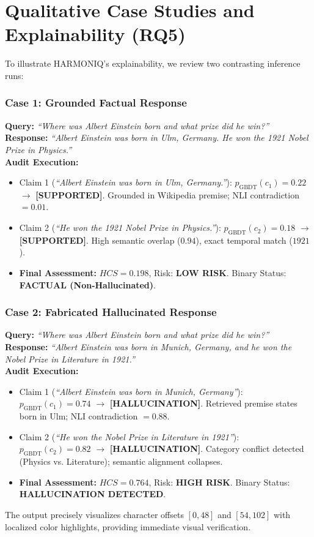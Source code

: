 \documentclass[conference]{IEEEtran}
\begin{document}
\section{Qualitative Case Studies and Explainability (RQ5)}
To illustrate HARMONIQ's explainability, we review two contrasting inference runs:

\subsubsection{Case 1: Grounded Factual Response}
\textbf{Query:} \textit{``Where was Albert Einstein born and what prize did he win?''}\\
\textbf{Response:} \textit{``Albert Einstein was born in Ulm, Germany. He won the 1921 Nobel Prize in Physics.''}\\
\textbf{Audit Execution:}
\begin{itemize}
    \item Claim 1 (\textit{``Albert Einstein was born in Ulm, Germany.''}): $p_{\text{GBDT}}(c_1) = 0.22$ $\to$ \textbf{\textcolor{green!60!black}{[SUPPORTED]}}. Grounded in Wikipedia premise; NLI contradiction $= 0.01$.
    \item Claim 2 (\textit{``He won the 1921 Nobel Prize in Physics.''}): $p_{\text{GBDT}}(c_2) = 0.18$ $\to$ \textbf{\textcolor{green!60!black}{[SUPPORTED]}}. High semantic overlap ($0.94$), exact temporal match ($1921$).
    \item \textbf{Final Assessment:} $HCS = 0.198$, Risk: \textbf{LOW RISK}. Binary Status: \textbf{FACTUAL (Non-Hallucinated)}.
\end{itemize}

\subsubsection{Case 2: Fabricated Hallucinated Response}
\textbf{Query:} \textit{``Where was Albert Einstein born and what prize did he win?''}\\
\textbf{Response:} \textit{``Albert Einstein was born in Munich, Germany, and he won the Nobel Prize in Literature in 1921.''}\\
\textbf{Audit Execution:}
\begin{itemize}
    \item Claim 1 (\textit{``Albert Einstein was born in Munich, Germany''}): $p_{\text{GBDT}}(c_1) = 0.74$ $\to$ \textbf{\textcolor{red!80!black}{[HALLUCINATION]}}. Retrieved premise states born in Ulm; NLI contradiction $= 0.88$.
    \item Claim 2 (\textit{``He won the Nobel Prize in Literature in 1921''}): $p_{\text{GBDT}}(c_2) = 0.82$ $\to$ \textbf{\textcolor{red!80!black}{[HALLUCINATION]}}. Category conflict detected (Physics vs. Literature); semantic alignment collapses.
    \item \textbf{Final Assessment:} $HCS = 0.764$, Risk: \textbf{HIGH RISK}. Binary Status: \textbf{HALLUCINATION DETECTED}.
\end{itemize}
The output precisely visualizes character offsets $[0, 48]$ and $[54, 102]$ with localized color highlights, providing immediate visual verification.
\end{document}
